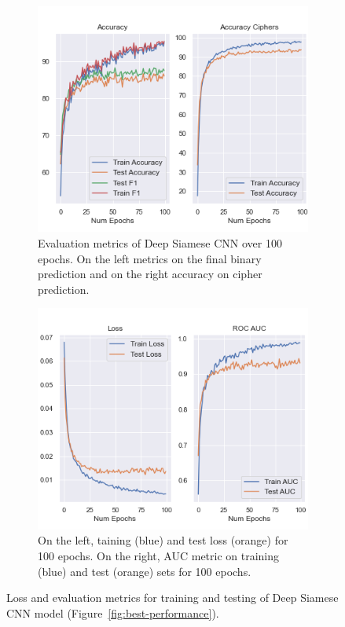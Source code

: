 \documentclass[10pt,conference,compsocconf]{IEEEtran}
\begin{document}
\begin{figure}[htp]
        \centering
        \begin{subfigure}[b]{0.45\columnwidth}
            \centering \includegraphics[width=\textwidth]{doc/project1-report/best_model_vis_acc.png}
            \caption[]%
            {\small Evaluation metrics of Deep Siamese CNN over 100 epochs. On the left metrics on the final binary prediction and on the right accuracy on cipher prediction. }   
     \label{fig:best-loss}
        \end{subfigure}
                \hfill 
        \begin{subfigure}[b]{0.45\columnwidth}
            \centering \includegraphics[width=\textwidth]{doc/project1-report/best_model_vis_loss.png}
            \caption[]%
            {\small On the left, taining (blue) and test loss (orange) for 100 epochs. On the right, AUC metric on training (blue) and test (orange) sets for 100 epochs. }     \label{fig:best-accuracy}
        \end{subfigure}
        \caption[]
        {Loss and evaluation metrics for training and testing of Deep Siamese CNN model (Figure~\ref{fig:best-performance}).}
        \label{fig:best-metrics}
    \end{figure}



\end{document}
